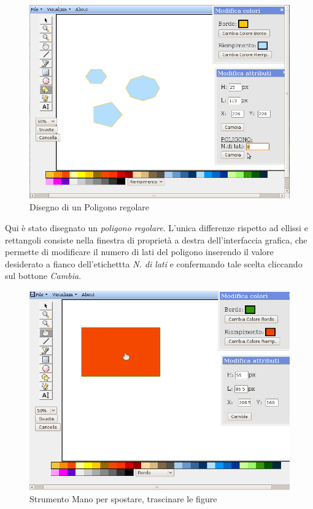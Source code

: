 \begin{figure}[!ht]
\centering
\includegraphics[scale=0.5]{images/poligono.png}
\caption{Disegno di un Poligono regolare}
\end{figure} 

\vspace{100pt}
Qui \`e stato disegnato un \textit{poligono regolare}. L'unica differenze rispetto ad ellissi e rettangoli consiste nella finestra di propriet\`a a destra dell'interfaccia grafica, che permette di modificare il numero di lati del poligono inserendo il valore desiderato a fianco dell'etichettta \textit{N. di lati} e confermando tale scelta cliccando sul bottone \textit{Cambia}.
\newpage

\begin{figure}[!ht]
\centering
\includegraphics[scale=0.5]{images/mano.png}
\caption{Strumento Mano per spostare, trascinare le figure}
\end{figure} 


